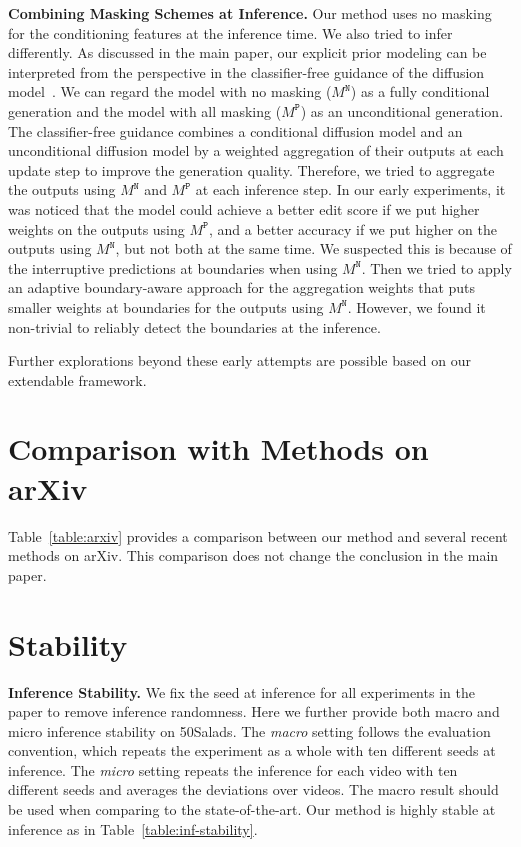 \documentclass[10pt,twocolumn,letterpaper]{article}
\begin{document}
\textbf{Combining Masking Schemes at Inference.}
Our method uses no masking for the conditioning features at the inference time.
We also tried to infer differently.
As discussed in the main paper, our explicit prior modeling can be interpreted from the perspective in the classifier-free guidance of the diffusion model~\cite{CFGuidance}.
We can regard the model with no masking ($M^\mathtt{N}$) as a fully conditional generation and the model with all masking ($M^\mathtt{P}$) as an unconditional generation.
The classifier-free guidance combines a conditional diffusion model and an unconditional diffusion model by a weighted aggregation of their outputs at each update step to improve the generation quality.
Therefore, we tried to aggregate the outputs using $M^\mathtt{N}$ and $M^\mathtt{P}$ at each inference step.
In our early experiments, it was noticed that the model could achieve a better edit score if we put higher weights on the outputs using $M^\mathtt{P}$, and a better accuracy if we put higher on the outputs using $M^\mathtt{N}$, but not both at the same time.
We suspected this is because of the interruptive predictions at boundaries when using $M^\mathtt{N}$.
Then we tried to apply an adaptive boundary-aware approach for the aggregation weights that puts smaller weights at boundaries for the outputs using $M^\mathtt{N}$.
However, we found it non-trivial to reliably detect the boundaries at the inference.

Further explorations beyond these early attempts are possible based on our extendable framework.


\section{Comparison with Methods on arXiv}

Table~\ref{table:arxiv} provides a comparison between our method and several recent methods on arXiv. 
This comparison does not change the conclusion in the main paper.

\section{Stability}

\textbf{Inference Stability.} We fix the seed at inference for all experiments in the paper to remove inference randomness. 
Here we further provide both macro and micro inference stability on 50Salads. 
The \textit{macro} setting follows the evaluation convention, which repeats the experiment as a whole with ten different seeds at inference. 
The \textit{micro} setting repeats the inference for each video with ten different seeds and averages the deviations over videos.
The macro result should be used when comparing to the state-of-the-art.
Our method is highly stable at inference as in Table~\ref{table:inf-stability}. 
\end{document}
